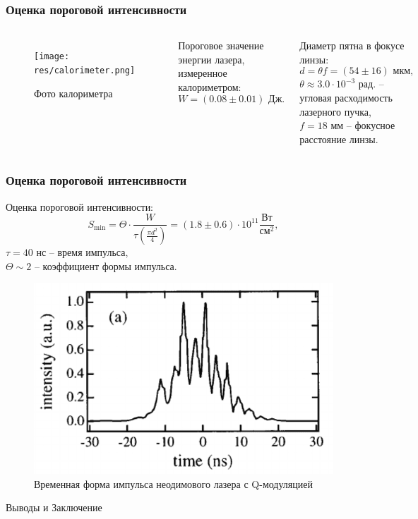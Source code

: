 \documentclass{beamer}
\begin{document}
	\begin{frame}
		\frametitle{Оценка пороговой интенсивности}
		\begin{columns}
			\begin{figure}
				\centering
				\texttt{[image: res/calorimeter.png]}
				\caption*{Фото калориметра}
			\end{figure}	
			\vspace{5pt}
			Пороговое значение энергии лазера, измеренное калориметром: 
			$$W = (0.08 \pm 0.01) \text{ Дж}.$$
			
			Диаметр пятна в фокусе линзы: 
			$$d = \theta f = (54 \pm 16) \text{ мкм},$$
			$\theta \approx 3.0 \cdot 10^{-3} \text{ рад.}$ -- угловая расходимость лазерного пучка, \\
			$f = 18 \text{ мм}$ -- фокусное расстояние линзы. \\
		\end{columns}
	\end{frame}	

	\begin{frame}
		\frametitle{Оценка пороговой интенсивности}
		\vspace{5pt}
		Оценка пороговой интенсивности: 
		$$S_{\text{min}} = \Theta \cdot \frac{W}{ \tau \left(\frac{\pi d^2}{4}\right)} = (1.8 \pm 0.6)\cdot10^{11} \frac{\text{Вт}}{\text{см}^2},$$
		$\tau = 40 \text{ нс}$ -- время импульса, \\
		$\Theta \sim 2$ -- коэффициент формы импульса.
		
		\begin{figure}
			\centering
			\includegraphics[width=0.5\linewidth]{res/qswitched_pulse_form.png}
			\caption*{Временная форма импульса неодимового лазера с Q-модуляцией}
		\end{figure}	
		
	\end{frame}	

	\begin{frame}[plain,c]
		
		\begin{center}
			\huge {} Выводы и Заключение
		\end{center}
		
	\end{frame}
\end{document}

